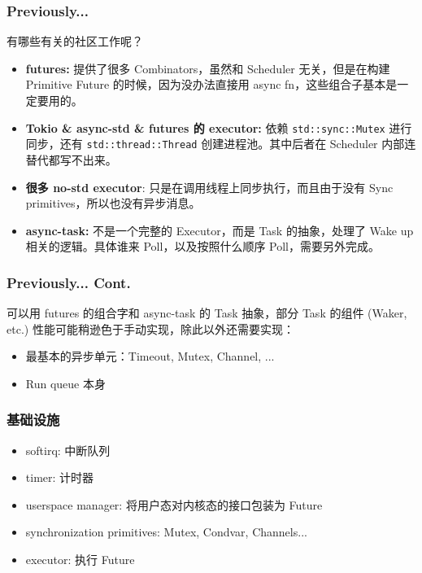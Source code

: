 \documentclass[UTF-8]{ctexbeamer}
\begin{document}
\begin{frame}
  \frametitle{Previously...}

  有哪些有关的社区工作呢？
  \pause
  \begin{itemize}
    \item \textbf{futures:} 提供了很多 Combinators，虽然和 Scheduler 无关，但是在构建 Primitive Future 的时候，因为没办法直接用 async fn，这些组合子基本是一定要用的。
    \pause
    \item \textbf{Tokio \& async-std \& futures 的 executor:} 依赖 \texttt{std::sync::Mutex} 进行同步，还有 \texttt{std::thread::Thread} 创建进程池。其中后者在 Scheduler 内部连替代都写不出来。
    \pause
    \item \textbf{很多 no-std executor}: 只是在调用线程上同步执行，而且由于没有 Sync primitives，所以也没有异步消息。
    \pause
    \item \textbf{async-task:} 不是一个完整的 Executor，而是 Task 的抽象，处理了 Wake up 相关的逻辑。具体谁来 Poll，以及按照什么顺序 Poll，需要另外完成。
  \end{itemize}

\end{frame}
\begin{frame}
  \frametitle{Previously... Cont.}
  可以用 futures 的组合字和 async-task 的 Task 抽象，部分 Task 的组件 (Waker, etc.) 性能可能稍逊色于手动实现，除此以外还需要实现：
  \begin{itemize}
    \item 最基本的异步单元：Timeout, Mutex, Channel, ...
    \item Run queue 本身
  \end{itemize}
\end{frame}

\begin{frame}[fragile]
  \frametitle{基础设施}

  \begin{itemize}
    \item softirq: 中断队列
    \item timer: 计时器
    \item userspace manager: 将用户态对内核态的接口包装为 Future
    \item synchronization primitives: Mutex, Condvar, Channels...
    \item executor: 执行 Future
  \end{itemize}

\end{frame}
\end{document}
